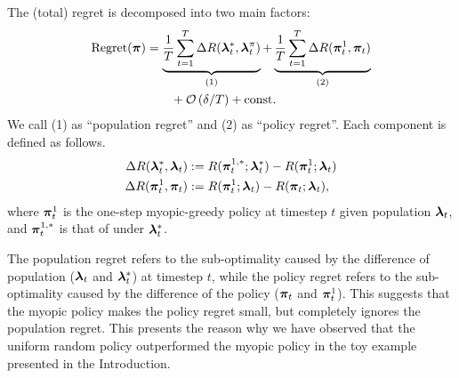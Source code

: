 \begin{theorem} \label{prop:regret}
The (total) regret is decomposed into two main factors:
\begin{align*}
    \mathrm{Regret}(\bm{\pi})
    &= \underbrace{\frac{1}{T} \sum_{t=1}^T \Delta R (\bm{\lambda}_t^{\ast},  \bm{\lambda}_t^{\pi})}_{(1)} + \underbrace{\frac{1}{T} \sum_{t=1}^T \Delta R (\bm{\pi}_t^{1}, \bm{\pi}_t)}_{(2)} \\
    & \quad \quad + \mathcal{O} \left(\delta / T \right) + \text{const.}
\end{align*} 
We call (1) as ``population regret'' and (2) as ``policy regret''. Each component is defined as follows.
\begin{align*}
    \Delta R (\bm{\lambda}_t^{\ast},  \bm{\lambda}_t) &:= R(\bm{\pi}_t^{1,\ast}; \bm{\lambda}_t^{\ast}) - R(\bm{\pi}_t^{1}; \bm{\lambda}_t) \\ 
    \Delta R (\bm{\pi}_t^{1}, \bm{\pi}_t) &:= R(\bm{\pi}_t^{1}; \bm{\lambda}_t) - R(\bm{\pi}_t; \bm{\lambda}_t),
\end{align*}
where $\bm{\pi}_t^{1}$ is the one-step myopic-greedy policy at timestep $t$ given population $\bm{\lambda}_t$, and $\bm{\pi}_t^{1,\ast}$ is that of under $\bm{\lambda}_t^{\ast}$. 
\end{theorem}

The population regret refers to the sub-optimality caused by the difference of population ($\bm{\lambda}_t$ and $\bm{\lambda}_t^{\ast}$) at timestep $t$, while the policy regret refers to the sub-optimality caused by the difference of the policy ($\bm{\pi}_t$ and $\bm{\pi}_t^{1}$). This suggests that the myopic policy makes the policy regret small, but completely ignores the population regret. 
This presents the reason why we have observed that the uniform random policy outperformed the myopic policy in the toy example presented 
in the Introduction. 
